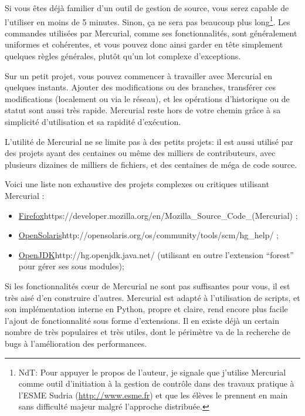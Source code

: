 Si vous êtes déjà familier d'un outil de gestion de source, vous serez
capable de l'utiliser en moins de 5 minutes. Sinon, ça ne sera pas beaucoup
plus long\footnote{NdT: Pour appuyer le propos de l'auteur, je signale que 
j'utilise Mercurial comme outil d'initiation à la gestion de contrôle dans
des travaux pratique à l'ESME Sudria (\url{http://www.esme.fr}) et que les
élèves le prennent en main sans difficulté majeur malgré l'approche distribuée.}. 
Les commandes utilisées par Mercurial, comme ses fonctionnalités, sont 
généralement uniformes et cohérentes, et vous pouvez donc ainsi garder en tête 
simplement quelques règles générales, plutôt qu'un lot complexe d'exceptions.

Sur un petit projet, vous pouvez commencer à travailler avec Mercurial en
quelques instants. Ajouter des modifications ou des branches, transférer 
ces modifications (localement ou via le réseau), et les opérations 
d'historique ou de statut sont aussi très rapide. Mercurial reste hors de 
votre chemin grâce à sa simplicité d'utilisation et sa rapidité d'exécution.

L'utilité de Mercurial ne se limite pas à des petits projets: il est 
aussi utilisé par des projets ayant des centaines ou même des milliers
de contributeurs, avec plusieurs dizaines de milliers de fichiers, et des
centaines de méga de code source.

Voici une liste non exhaustive des projets complexes ou critiques utilisant 
Mercurial :
\begin{itemize}
	\item \url{Firefox}{https://developer.mozilla.org/en/Mozilla\_Source\_Code\_(Mercurial)} ;
	\item \url{OpenSolaris}{http://opensolaris.org/os/community/tools/scm/hg\_help/} ;
	\item \url{OpenJDK}{http://hg.openjdk.java.net/} (utilisant en outre l'extension 
	``forest'' pour gérer ses sous modules);
\end{itemize}

Si les fonctionnalités cœur de Mercurial ne sont pas suffisantes pour vous, 
il est très aisé d'en construire d'autres. Mercurial est adapté à l'utilisation
de scripts, et son implémentation interne en Python, propre et claire,
rend encore plus facile l'ajout de fonctionnalité sous forme d'extensions. Il
en existe déjà un certain nombre de très populaires et très utiles, 
dont le périmètre va de la recherche de bugs à l'amélioration des performances.

